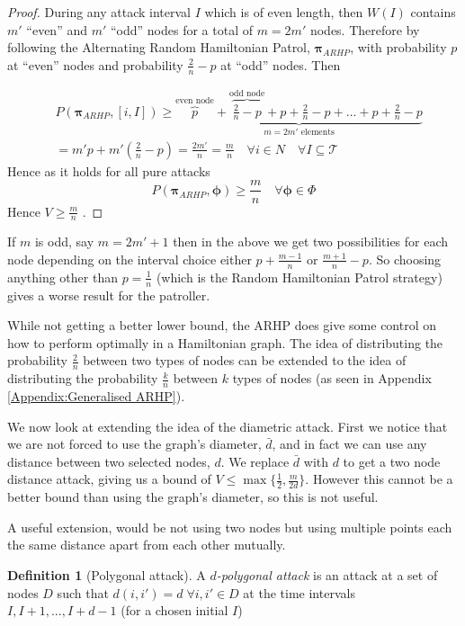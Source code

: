 \documentclass[a4paper,10pt]{article}
\theoremstyle{definition}
\newtheorem{definition}[theorem]{Definition}
\theoremstyle{definition}
\theoremstyle{remark}
\theoremstyle{definition}
\begin{document}
\begin{proof}
During any attack interval $I$ which is of even length, then $W(I)$ contains $m'$ ``even'' and $m'$ ``odd'' nodes for a total of $m=2m'$ nodes. Therefore by following the Alternating Random Hamiltonian Patrol, $\pmb{\pi}_{ARHP}$, with probability $p$ at ``even'' nodes and probability $\frac{2}{n}-p$ at ``odd'' nodes. Then

\begin{align*}
&P(\bm{\pi}_{ARHP},[i,I]) \geq \underbrace{\overbrace{p}^{\text{even node}}+\overbrace{\frac{2}{n}-p}^{\text{odd node}}+p+\frac{2}{n}-p+...+p+\frac{2}{n}-p}_{m=2m' \text{ elements}} \\
&=m' p+m'(\frac{2}{n}-p)=\frac{2m'}{n}=\frac{m}{n} \quad \forall i \in N \quad \forall I \subseteq \mathcal{T}
\end{align*}
Hence as it holds for all pure attacks
$$P(\bm{\pi}_{ARHP},\bm{\phi}) \geq \frac{m}{n} \quad \forall \bm{\phi} \in \Phi$$
Hence $V \geq \frac{m}{n}$ .
\end{proof}

If $m$ is odd, say $m=2m'+1$ then in the above we get two possibilities for each node depending on the interval choice either $p+\frac{m-1}{n}$ or $\frac{m+1}{n}-p$. So choosing anything other than $p=\frac{1}{n}$ (which is the Random Hamiltonian Patrol strategy) gives a worse result for the patroller.

While not getting a better lower bound, the ARHP does give some control on how to perform optimally in a Hamiltonian graph. The idea of distributing the probability $\frac{2}{n}$ between two types of nodes can be extended to the idea of distributing the probability $\frac{k}{n}$ between $k$ types of nodes (as seen in Appendix \ref{Appendix:Generalised ARHP}).


We now look at extending the idea of the diametric attack. First we notice that we are not forced to use the graph's diameter, $\bar{d}$, and in fact we can use any distance between two selected nodes, $d$. We replace $\bar{d}$ with $d$ to get a two node distance attack, giving us a bound of $V \leq \max \{\frac{1}{2} ,\frac{m}{2d} \}$. However this cannot be a better bound than using the graph's diameter, so this is not useful.

A useful extension, would be not using two nodes but using multiple points each the same distance apart from each other mutually.

\begin{definition}[Polygonal attack]
A \textit{$d$-polygonal attack} is an attack at a set of nodes $D$ such that $d(i,i')=d \; \forall i,i' \in D$ at the time intervals $I,I+1,...,I+d-1$ (for a chosen initial $I$)
\end{definition}
\end{document}
